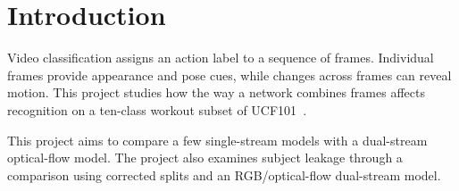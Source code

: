 \section{Introduction}
\label{sec:intro}
Video classification assigns an action label to a sequence of frames.
Individual frames provide appearance and pose cues, while changes across
frames can reveal motion. This project studies how the way a network combines
frames affects recognition on a ten-class workout subset of
UCF101~\cite{soomro2012ucf101}.

This project aims to compare a few single-stream models with a dual-stream optical-flow model. 
The project also examines subject leakage through a comparison using corrected 
splits and an RGB/optical-flow dual-stream model.
